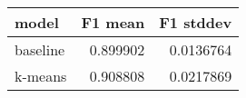 \begin{tabular}{lrr}
\toprule
 model    &   F1 mean &   F1 stddev \\
\midrule
 baseline &  0.899902 &   0.0136764 \\
 k-means  &  0.908808 &   0.0217869 \\
\bottomrule
\end{tabular}
